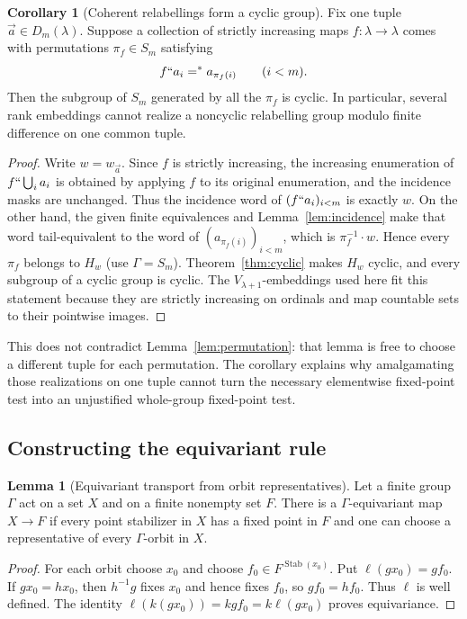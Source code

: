 \documentclass[11pt,letterpaper]{article}
\theoremstyle{definition}
\newtheorem{lemma}[definition]{Lemma}
\newtheorem{corollary}[definition]{Corollary}
\numberwithin{equation}{section}
\newcommand{\Stab}{\operatorname{Stab}}
\newcommand{\Efin}{\mathrel{=^*}}
\begin{document}
\begin{corollary}[Coherent relabellings form a cyclic group]\label{cor:coherent}
Fix one tuple $\vec a\in D_m(\lambda)$. Suppose a collection of strictly increasing maps $f:\lambda\to\lambda$ comes with permutations $\pi_f\in S_m$ satisfying
\[
 f``a_i\Efin a_{\pi_f(i)}\qquad(i<m).
\]
Then the subgroup of $S_m$ generated by all the $\pi_f$ is cyclic. In particular, several rank embeddings cannot realize a noncyclic relabelling group modulo finite difference on one common tuple.
\end{corollary}

\begin{proof}
Write $w=w_{\vec a}$. Since $f$ is strictly increasing, the increasing enumeration of $f``\bigcup_i a_i$ is obtained by applying $f$ to its original enumeration, and the incidence masks are unchanged. Thus the incidence word of $(f``a_i)_{i<m}$ is exactly $w$. On the other hand, the given finite equivalences and Lemma~\ref{lem:incidence} make that word tail-equivalent to the word of $(a_{\pi_f(i)})_{i<m}$, which is $\pi_f^{-1}\cdot w$. Hence every $\pi_f$ belongs to $H_w$ (use $\Gamma=S_m$). Theorem~\ref{thm:cyclic} makes $H_w$ cyclic, and every subgroup of a cyclic group is cyclic. The $V_{\lambda+1}$-embeddings used here fit this statement because they are strictly increasing on ordinals and map countable sets to their pointwise images.
\end{proof}

This does not contradict Lemma~\ref{lem:permutation}: that lemma is free to choose a different tuple for each permutation. The corollary explains why amalgamating those realizations on one tuple cannot turn the necessary elementwise fixed-point test into an unjustified whole-group fixed-point test.

\subsection{Constructing the equivariant rule}

\begin{lemma}[Equivariant transport from orbit representatives]\label{lem:transport}
Let a finite group $\Gamma$ act on a set $X$ and on a finite nonempty set $F$. There is a $\Gamma$-equivariant map $X\to F$ if every point stabilizer in $X$ has a fixed point in $F$ and one can choose a representative of every $\Gamma$-orbit in $X$.
\end{lemma}

\begin{proof}
For each orbit choose $x_0$ and choose $f_0\in F^{\Stab(x_0)}$. Put $\ell(gx_0)=gf_0$. If $gx_0=hx_0$, then $h^{-1}g$ fixes $x_0$ and hence fixes $f_0$, so $gf_0=hf_0$. Thus $\ell$ is well defined. The identity $\ell(k(gx_0))=kgf_0=k\ell(gx_0)$ proves equivariance.
\end{proof}
\end{document}
